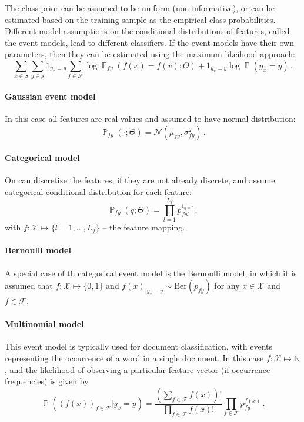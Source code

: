 \documentclass[a4paper]{article}
\newcommand{\Fcal}{\mathcal{F}}
\newcommand{\Ncal}{\mathcal{N}}
\newcommand{\Xcal}{\mathcal{X}}
\newcommand{\Ycal}{\mathcal{Y}}
\newcommand{\pr}{\mathop{\mathbb{P}}\nolimits}
\begin{document}
The class prior can be assumed to be uniform (non-informative), or can be estimated
based on the training sample as the empirical class probabilities. Different model
assumptions on the conditional distributions of features, called the event models,
lead to different classifiers. If the event models have their own parameters, then
they can be estimated using the maximum likeihood approach:
$$ \sum_{x\in S} \sum_{y\in \Ycal}
    1_{y_x=y} \sum_{f\in \Fcal} \log \pr_{fy}(f(x) = f(v); \Theta)
    + 1_{y_x=y} \log \pr(y_x = y)
    \,. $$

\paragraph{Gaussian event model} %
\label{par:gaussian_event_model}
In this case all features are real-values and assumed to have normal distribution:
$$ \pr_{fy}(\cdot; \Theta) = \Ncal(\mu_{fy}, \sigma^2_{fy})\,. $$

\paragraph{Categorical model} %
\label{par:categorical_model}

On can discretize the features, if they are not already discrete, and assume categorical
conditional distribution for each feature:
$$ \pr_{fy}(q; \Theta) = \prod_{l=1}^{L_f} p_{fyl}^{1_{q=l}} \,,$$
with $f:\Xcal\mapsto \{l=1,\ldots, L_f\}$ -- the feature mapping.


\paragraph{Bernoulli model} %
\label{par:bernoulli_model}

A special case of th categorical event model is the Bernoulli model, in which it
is assumed that $f:\Xcal\mapsto\{0,1\}$ and $f(x)_{|y_x=y}\sim \text{Ber}(p_{fy})$
for any $x\in \Xcal$ and $f\in \Fcal$.


\paragraph{Multinomial model} %
\label{par:multinomial_model}

This event model is typically used for document classification, with events representing
the occurrence of a word in a single document. In this case $f:\Xcal\mapsto \mathbb{N}$,
and the likelihood of observing a particular feature vector (if occurrence frequencies)
is given by
$$ \pr((f(x))_{f\in \Fcal}| y_x=y)
    = \frac{(\sum_{f\in \Fcal} f(x))!}{\prod_{f\in \Fcal} f(x)!}
        \prod_{f\in \Fcal} p_{fy}^{f(x)} \,. $$
\end{document}
